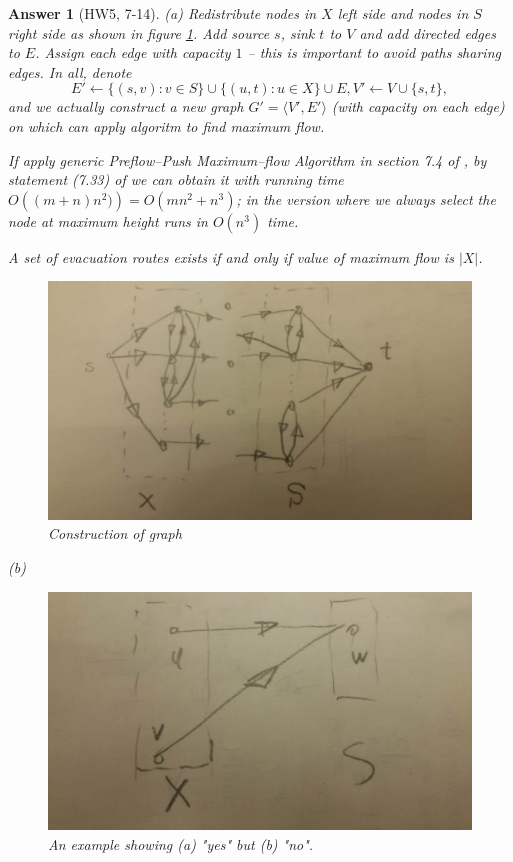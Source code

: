 \documentclass[11pt]{article}
\theoremstyle{numberplain}
\theoremstyle{nonumberplain}
\newtheorem{ans}{Answer}
\newcommand{\0}{{\mathbf{0}}}
\begin{document}
\begin{ans}[HW5, 7-14]
(a) Redistribute nodes in $X$ left side and nodes in $S$ right side as shown in figure \ref{fig:7-14-a construction of graph}. Add source $s$, sink $t$ to $V$ and add directed edges to $E$.  Assign each edge with capacity $1$ -- this is important to avoid paths sharing edges. In all, denote 
$$E'\leftarrow \{(s,v):v\in S\}\cup \{(u,t):u\in X \}\cup E, V'\leftarrow V\cup \{s,t\},$$
and we actually construct a new graph $G'=\langle V',E'\rangle$ (with capacity on each edge) on which can apply algoritm to find maximum flow.\par
If apply generic Preflow--Push Maximum--flow Algorithm in section 7.4 of \cite{jon2005algorithm}, by statement (7.33) of \cite{jon2005algorithm} we can obtain it with running time $O\left((m+n)n^2)\right)=O(mn^2+n^3)$; in the version where we always select the node at maximum height runs in $O(n^3)$ time.
\par
A set of evacuation routes exists if and only if value of maximum flow is $|X|$.
\begin{figure}
\begin{center}
\includegraphics[width=\textwidth]{7_14_a.jpg}
\end{center}
\caption{Construction of graph}
\label{fig:7-14-a construction of graph}
\end{figure}
\par 
(b) 

\begin{figure}
\begin{center}
\includegraphics[width=\textwidth]{7_14_b.jpg}
\end{center}
\caption{An example showing (a) "yes" but (b) "no".}
\label{fig:7-14-b an example}
\end{figure}
\end{ans}
\end{document}
